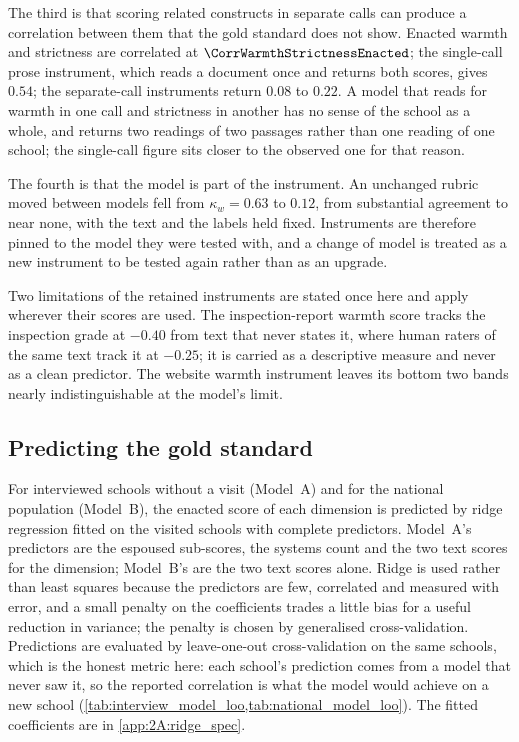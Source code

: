 The third is that scoring related constructs in separate calls can produce
a correlation between them that the gold standard does not show. Enacted
warmth and strictness are correlated at $\CorrWarmthStrictnessEnacted$; the
single-call prose instrument, which reads a document once and returns both
scores, gives $0.54$; the separate-call instruments return $0.08$ to $0.22$.
A model that reads for warmth in one call and strictness in another has no
sense of the school as a whole, and returns two readings of two passages
rather than one reading of one school; the single-call figure sits closer to
the observed one for that reason.

The fourth is that the model is part of the instrument. An unchanged rubric
moved between models fell from $\kappa_w = 0.63$ to $0.12$, from substantial
agreement to near none, with the text and the labels held fixed. Instruments
are therefore pinned to the model they were tested with, and a change of
model is treated as a new instrument to be tested again rather than as an
upgrade.

Two limitations of the retained instruments are stated once here and apply
wherever their scores are used. The inspection-report warmth score tracks the
inspection grade at $-0.40$ from text that never states it, where human
raters of the same text track it at $-0.25$; it is carried as a descriptive
measure and never as a clean predictor. The website warmth instrument leaves
its bottom two bands nearly indistinguishable at the model's limit.



\subsection{Predicting the gold standard}

For interviewed schools without a visit (Model~A) and for the national
population (Model~B), the enacted score of each dimension is predicted by
ridge regression fitted on the \RidgeTrainN{} visited schools with complete
predictors. Model~A's predictors are the espoused sub-scores, the systems
count and the two text scores for the dimension; Model~B's are the two text
scores alone. Ridge is used rather than least squares because the predictors
are few, correlated and measured with error, and a small penalty on the
coefficients trades a little bias for a useful reduction in variance; the
penalty is chosen by generalised cross-validation. Predictions are evaluated by
leave-one-out cross-validation on the same schools, which is the honest
metric here: each school's prediction comes from a model that never saw it,
so the reported correlation is what the model would achieve on a new school
(\cref{tab:interview_model_loo,tab:national_model_loo}). The fitted
coefficients are in \cref{app:2A:ridge_spec}.

